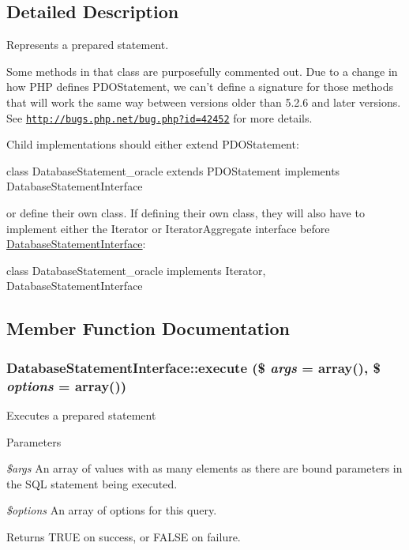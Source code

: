 \subsection{Detailed Description}
Represents a prepared statement.

Some methods in that class are purposefully commented out. Due to a change in how PHP defines PDOStatement, we can't define a signature for those methods that will work the same way between versions older than 5.2.6 and later versions. See \href{http://bugs.php.net/bug.php?id=42452}{\tt http://bugs.php.net/bug.php?id=42452} for more details.

Child implementations should either extend PDOStatement: 
\begin{DoxyCode}
 class DatabaseStatement_oracle extends PDOStatement implements 
      DatabaseStatementInterface {}
\end{DoxyCode}
 or define their own class. If defining their own class, they will also have to implement either the Iterator or IteratorAggregate interface before \hyperlink{interfaceDatabaseStatementInterface}{DatabaseStatementInterface}: 
\begin{DoxyCode}
 class DatabaseStatement_oracle implements Iterator, DatabaseStatementInterface {
      }
\end{DoxyCode}
 

\subsection{Member Function Documentation}
\hypertarget{interfaceDatabaseStatementInterface_a716e454a44a7667f7a90b90c1a6fe3eb}{
\subsubsection[{execute}]{\setlength{\rightskip}{0pt plus 5cm}DatabaseStatementInterface::execute (\$ {\em args} = {\ttfamily array()}, \/  \$ {\em options} = {\ttfamily array()})}}
\label{interfaceDatabaseStatementInterface_a716e454a44a7667f7a90b90c1a6fe3eb}
Executes a prepared statement


\begin{DoxyParams}{Parameters}
\item[{\em \$args}]An array of values with as many elements as there are bound parameters in the SQL statement being executed. \item[{\em \$options}]An array of options for this query.\end{DoxyParams}
\begin{DoxyReturn}{Returns}
TRUE on success, or FALSE on failure. 
\end{DoxyReturn}


